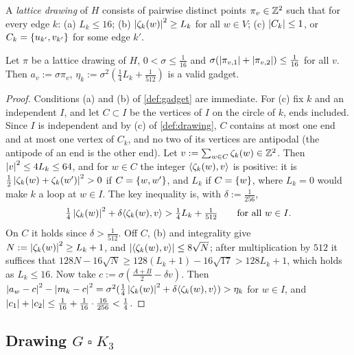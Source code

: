 \begin{definition}\label{def:drawing}
A \emph{lattice drawing} of $H$ consists of pairwise distinct points $\pi_v\in\mathbb{Z}^2$ such that for every edge $k$: (a) $L_k\le16$; (b) $\left\lvert \zeta_k(w) \right\rvert^2\ge L_k$ for all $w\in V$; (c) $\left\lvert C_k \right\rvert\le1$, or $C_k=\left\{ u_{k'},v_{k'} \right\}$ for some edge $k'$.
\end{definition}

\begin{lemma}\label{lem:disks}
Let $\pi$ be a lattice drawing of $H$, $0<\sigma\le\frac1{16}$ and $\sigma(\left\lvert \pi_{v,1} \right\rvert+\left\lvert \pi_{v,2} \right\rvert)\le\frac1{16}$ for all $v$. Then $a_v:=\sigma\pi_v$, $\eta_k:=\sigma^2(\frac14L_k+\frac1{512})$ is a valid gadget.
\end{lemma}

\begin{proof}
Conditions (a) and (b) of \cref{def:gadget} are immediate. For (c) fix $k$ and an independent $I$, and let $C\subset I$ be the vertices of $I$ on the circle of $k$, ends included. Since $I$ is independent and by (c) of \cref{def:drawing}, $C$ contains at most one end and at most one vertex of $C_k$, and no two of its vertices are antipodal (the antipode of an end is the other end). Let $v:=\sum_{w\in C}\zeta_k(w)\in\mathbb{Z}^2$. Then $\left\lvert v \right\rvert^2\le4L_k\le64$, and for $w\in C$ the integer $\langle \zeta_k(w), v\rangle$ is positive: it is $\frac12\left\lvert \zeta_k(w)+\zeta_k(w') \right\rvert^2>0$ if $C=\left\{ w,w' \right\}$, and $L_k$ if $C=\left\{ w \right\}$, where $L_k=0$ would make $k$ a loop at $w\in I$. The key inequality is, with $\delta:=\frac1{256}$,
\[
\tfrac14\left\lvert \zeta_k(w) \right\rvert^2+\delta\langle \zeta_k(w), v\rangle>\tfrac14L_k+\tfrac1{512}\qquad\text{for all }w\in I.
\]
On $C$ it holds since $\delta>\frac1{512}$. Off $C$, (b) and integrality give $N:=\left\lvert \zeta_k(w) \right\rvert^2\ge L_k+1$, and $\left\lvert \langle \zeta_k(w), v\rangle \right\rvert\le8\sqrt N$; after multiplication by $512$ it suffices that $128N-16\sqrt N\ge128(L_k+1)-16\sqrt{17}>128L_k+1$, which holds as $L_k\le16$. Now take $c:=\sigma(\frac{A+B}2-\delta v)$. Then $\left\lvert a_w-c \right\rvert^2-\left\lvert m_k-c \right\rvert^2=\sigma^2(\frac14\left\lvert \zeta_k(w) \right\rvert^2+\delta\langle \zeta_k(w), v\rangle)>\eta_k$ for $w\in I$, and $\left\lvert c_1 \right\rvert+\left\lvert c_2 \right\rvert\le\frac1{16}+\frac1{16}\cdot\frac{16}{256}<\frac14$.
\end{proof}

\subsection{\texorpdfstring{Drawing $G\mathbin{\square}K_3$}{Drawing G box K3}}\label{sec:layout}

